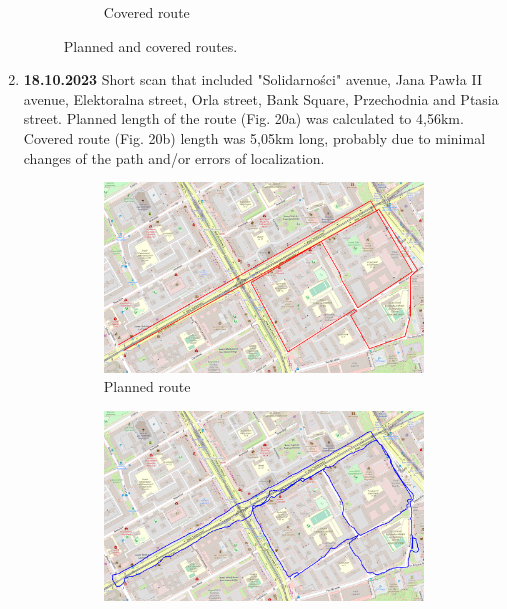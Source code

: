 \documentclass[a4paper,12pt]{article}
\begin{document}
\begin{enumerate}
\begin{figure}[H]
\begin{subfigure}{.95\textwidth}
			\caption{Covered route}
			\label{fig:b18}
		\end{subfigure}
		\caption{Planned and covered routes.}
		\label{fig:fig18}
	\end{figure}
	\item \textbf{18.10.2023} Short scan that included "Solidarności" avenue, Jana Pawła II avenue, Elektoralna street, Orla street, Bank Square, Przechodnia and Ptasia street. Planned length of the route (Fig. 20a) was calculated to 4,56km. Covered route (Fig. 20b) length was 5,05km long, probably due to minimal changes of the path and/or errors of localization.
	\pagebreak
	\begin{figure}[H]
		\centering
		\begin{subfigure}{.95\textwidth}
			\centering
			\includegraphics[width=1\linewidth]{route_p19}
			\caption{Planned route}
			\label{fig:a19}
		\end{subfigure}%
		\linebreak
		\begin{subfigure}{.95\textwidth}
			\centering
			\includegraphics[width=1\linewidth]{route_c19}

\end{subfigure}
\end{figure}
\end{enumerate}
\end{document}
